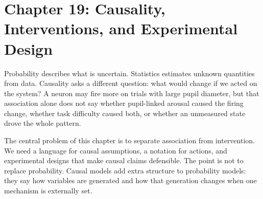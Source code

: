 \section{Chapter 19: Causality, Interventions, and Experimental Design}
\label{ch:causality-interventions-experimental-design}

Probability describes what is uncertain. Statistics estimates unknown quantities from data. Causality asks a different question: what would change if we acted on the system? A neuron may fire more on trials with large pupil diameter, but that association alone does not say whether pupil-linked arousal caused the firing change, whether task difficulty caused both, or whether an unmeasured state drove the whole pattern.

The central problem of this chapter is to separate association from intervention. We need a language for causal assumptions, a notation for actions, and experimental designs that make causal claims defensible. The point is not to replace probability. Causal models add extra structure to probability models: they say how variables are generated and how that generation changes when one mechanism is externally set.


